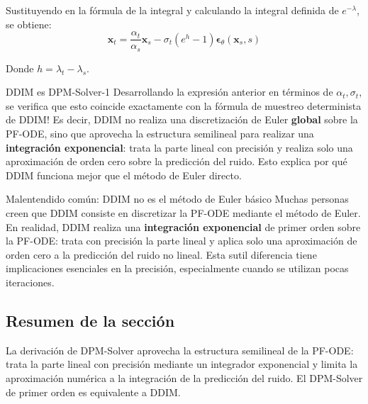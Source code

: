 Sustituyendo en la fórmula de la integral y calculando la integral definida de $e^{-\lambda}$, se obtiene:
$$\mathbf{x}_t = \frac{\alpha_t}{\alpha_s} \mathbf{x}_s - \sigma_t (e^{h} - 1) \boldsymbol{\epsilon}_\theta(\mathbf{x}_s, s)$$

Donde $h = \lambda_t - \lambda_s$.

\begin{importantbox}{DDIM es DPM-Solver-1}
Desarrollando la expresión anterior en términos de $\alpha_t, \sigma_t$, se verifica que esto coincide exactamente con la fórmula de muestreo determinista de DDIM! Es decir, DDIM no realiza una discretización de Euler \textbf{global} sobre la PF-ODE, sino que aprovecha la estructura semilineal para realizar una \textbf{integración exponencial}: trata la parte lineal con precisión y realiza solo una aproximación de orden cero sobre la predicción del ruido. Esto explica por qué DDIM funciona mejor que el método de Euler directo.
\end{importantbox}

\begin{warningbox}{Malentendido común: DDIM no es el método de Euler básico}
Muchas personas creen que DDIM consiste en discretizar la PF-ODE mediante el método de Euler. En realidad, DDIM realiza una \textbf{integración exponencial} de primer orden sobre la PF-ODE: trata con precisión la parte lineal y aplica solo una aproximación de orden cero a la predicción del ruido no lineal. Esta sutil diferencia tiene implicaciones esenciales en la precisión, especialmente cuando se utilizan pocas iteraciones.
\end{warningbox}

\subsection{Resumen de la sección}

La derivación de DPM-Solver aprovecha la estructura semilineal de la PF-ODE: trata la parte lineal con precisión mediante un integrador exponencial y limita la aproximación numérica a la integración de la predicción del ruido. El DPM-Solver de primer orden es equivalente a DDIM.

